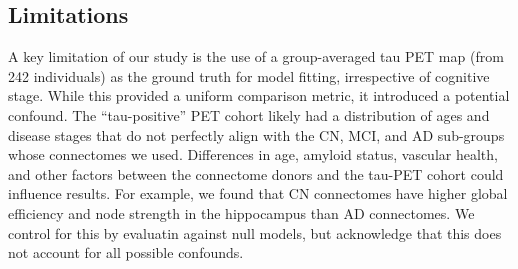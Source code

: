 \subsection{Limitations}
A key limitation of our study is the use of a group-averaged tau PET map (from 242 individuals) as the ground truth for model fitting, irrespective of cognitive stage. While this provided a uniform comparison metric, it introduced a potential confound. The “tau-positive” PET cohort likely had a distribution of ages and disease stages that do not perfectly align with the CN, MCI, and AD sub-groups whose connectomes we used. Differences in age, amyloid status, vascular health, and other factors between the connectome donors and the tau-PET cohort could influence results. For example, we found that CN connectomes have higher global efficiency and node strength in the hippocampus than AD connectomes. We control for this by evaluatin against null models, but acknowledge that this does not account for all possible confounds.

